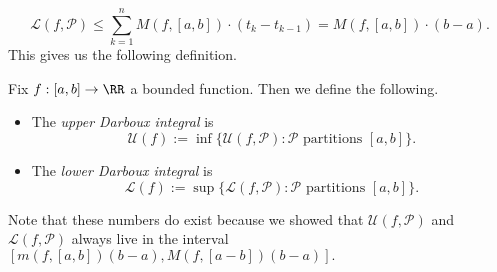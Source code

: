 \[\mathcal L(f,\mathcal P)\le\sum_{k=1}^nM(f,[a,b])\cdot(t_k-t_{k-1})=M(f,[a,b])\cdot(b-a).\]
This gives us the following definition.
\begin{definition}
	Fix $f:[a,b]\to\RR$ a bounded function. Then we define the following.
	\begin{itemize}
		\item The \textit{upper Darboux integral} is
		\[\mathcal U(f):=\inf\{\mathcal U(f,\mathcal P):\mathcal P\text{ partitions }[a,b]\}.\]
		\item The \textit{lower Darboux integral} is
		\[\mathcal L(f):=\sup\{\mathcal L(f,\mathcal P):\mathcal P\text{ partitions }[a,b]\}.\]
	\end{itemize}
\end{definition}
Note that these numbers do exist because we showed that $\mathcal U(f,\mathcal P)$ and $\mathcal L(f,\mathcal P)$ always live in the interval $[m(f,[a,b])(b-a), M(f,[a-b])(b-a)].$

